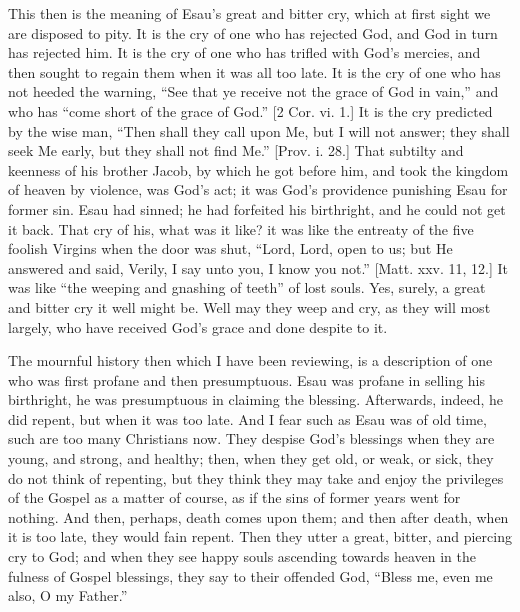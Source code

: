 This then is the meaning of Esau's great and bitter cry, which at
first sight we are disposed to pity. It is the cry of one who has
rejected God, and God in turn has rejected him. It is the cry of one who
has trifled with God's mercies, and then sought to regain them when it
was all too late. It is the cry of one who has not heeded the warning,
``See that ye receive not the grace of God in vain,'' and who
has ``come short of the grace of God.'' [2 Cor. vi. 1.] It is
the cry predicted by the wise man, ``Then shall they call upon Me,
but I will not answer; they shall seek Me early, but they shall not find
Me.'' [Prov. i. 28.] That subtilty and keenness of his brother
Jacob, by which he got before him, and took the kingdom of heaven by
violence, was God's act; it was God's providence punishing Esau for
former sin. Esau had sinned; he had forfeited his birthright, and he
could not get it back. That cry of his, what was it like? it was like
the entreaty of the five foolish Virgins when the door was shut,
``Lord, Lord, open to us; but He answered and said, Verily, I say
unto you, I know you not.'' [Matt. xxv. 11, 12.] It was like
``the weeping and gnashing of teeth'' of lost souls. Yes,
surely, a great and bitter cry it well might be. Well may they weep and
cry, as they will most largely, who have received God's grace and done
despite to it.

The mournful history then which I have been reviewing, is a
description of one who was first profane and then presumptuous. Esau was
profane in selling his birthright, he was presumptuous in claiming the
blessing. Afterwards, indeed, he did repent, but when it was too late.
And I fear such as Esau was of old time, such are too many Christians
now. They despise God's blessings when they are young, and strong, and
healthy; then, when they get old, or weak, or sick, they do not think of
repenting, but they think they may take and enjoy the privileges of the
Gospel as a matter of course, as if the sins of former years went for
nothing. And then, perhaps, death comes upon them; and then after death,
when it is too late, they would fain repent. Then they utter a great,
bitter, and piercing cry to God; and when they see happy souls ascending
towards heaven in the fulness of Gospel blessings, they say to their
offended God, ``Bless me, even me also, O my Father.''

